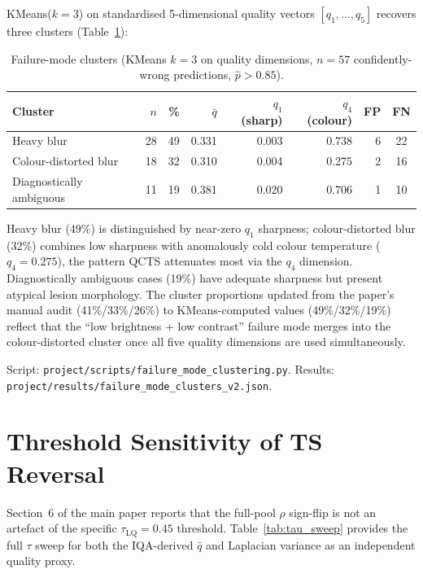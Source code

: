 \documentclass{bmvc2k}
\newcommand{\qbar}{\bar{q}}
\begin{document}
KMeans($k{=}3$) on standardised 5-dimensional quality vectors $[q_1,\ldots,q_5]$ recovers three clusters (Table~\ref{tab:failure_clusters}):

\begin{table}[h]
\centering
\caption{Failure-mode clusters (KMeans $k{=}3$ on quality dimensions, $n{=}57$ confidently-wrong predictions, $\hat p{>}0.85$).}
\label{tab:failure_clusters}
\footnotesize
\begin{tabular}{lrrrrrrc}
\toprule
Cluster & $n$ & \% & $\bar{q}$ & $q_1$ (sharp) & $q_4$ (colour) & FP & FN \\
\midrule
Heavy blur      & 28 & 49 & 0.331 & 0.003 & 0.738 & 6  & 22 \\
Colour-distorted blur & 18 & 32 & 0.310 & 0.004 & 0.275 & 2  & 16 \\
Diagnostically ambiguous & 11 & 19 & 0.381 & 0.020 & 0.706 & 1  & 10 \\
\bottomrule
\end{tabular}
\end{table}

Heavy blur (49\%) is distinguished by near-zero $q_1$ sharpness; colour-distorted blur (32\%) combines low sharpness with anomalously cold colour temperature ($q_4{=}0.275$), the pattern QCTS attenuates most via the $q_4$ dimension. Diagnostically ambiguous cases (19\%) have adequate sharpness but present atypical lesion morphology. The cluster proportions updated from the paper's manual audit (41\%/33\%/26\%) to KMeans-computed values (49\%/32\%/19\%) reflect that the ``low brightness + low contrast'' failure mode merges into the colour-distorted cluster once all five quality dimensions are used simultaneously.

Script: \texttt{project/scripts/failure\_mode\_clustering.py}.
Results: \texttt{project/results/failure\_mode\_clusters\_v2.json}.

\section{Threshold Sensitivity of TS Reversal}
\label{app:threshold_sensitivity}

Section~6 of the main paper reports that the full-pool $\rho$ sign-flip is not an artefact of the specific $\tau_\text{LQ}{=}0.45$ threshold. Table~\ref{tab:tau_sweep} provides the full $\tau$ sweep for both the IQA-derived $\qbar$ and Laplacian variance as an independent quality proxy.
\end{document}
